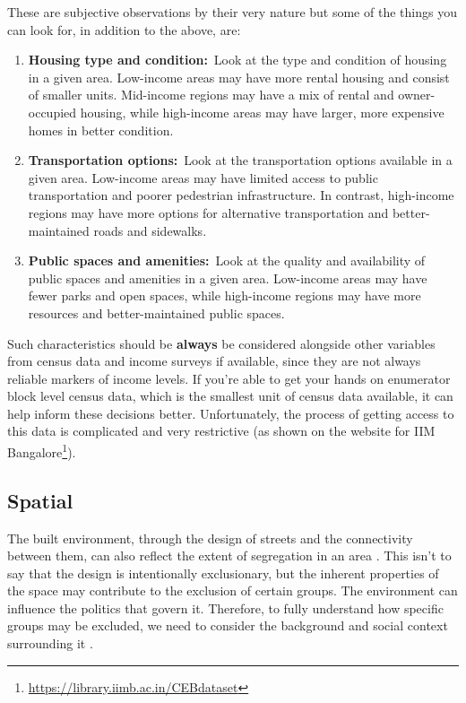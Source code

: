 \documentclass[
]{latex/krantz}
\renewcommand{\href}[2]{#2\footnote{\url{#1}}}
\DeclareRobustCommand{\href}[2]{#2\footnote{\url{#1}}}
\begin{document}
These are subjective observations by their very nature but some of the things you can look for, in addition to the above, are:

\begin{enumerate}
\def\labelenumi{\arabic{enumi}.}
\item
  \textbf{Housing type and condition:}~Look at the type and condition of housing in a given area. Low-income areas may have more rental housing and consist of smaller units. Mid-income regions may have a mix of rental and owner-occupied housing, while high-income areas may have larger, more expensive homes in better condition.
\item
  \textbf{Transportation options:}~Look at the transportation options available in a given area. Low-income areas may have limited access to public transportation and poorer pedestrian infrastructure. In contrast, high-income regions may have more options for alternative transportation and better-maintained roads and sidewalks.
\item
  \textbf{Public spaces and amenities:}~Look at the quality and availability of public spaces and amenities in a given area. Low-income areas may have fewer parks and open spaces, while high-income regions may have more resources and better-maintained public spaces.
\end{enumerate}

Such characteristics should be \textbf{always} be considered alongside other variables from census data and income surveys if available, since they are not always reliable markers of income levels. If you're able to get your hands on enumerator block level census data, which is the smallest unit of census data available, it can help inform these decisions better. Unfortunately, the process of getting access to this data is complicated and very restrictive (as shown \href{https://library.iimb.ac.in/CEBdataset}{on the website for IIM Bangalore}).

\hypertarget{spatial}{%
\subsection{Spatial}\label{spatial}}

The built environment, through the design of streets and the connectivity between them, can also reflect the extent of segregation in an area \autocite{vlachouSuccessionalSegregationGerani2015}. This isn't to say that the design is intentionally exclusionary, but the inherent properties of the space may contribute to the exclusion of certain groups. The environment can influence the politics that govern it. Therefore, to fully understand how specific groups may be excluded, we need to consider the background and social context surrounding it \autocite{winnerArtifactsHavePolitics1980}.
\end{document}
